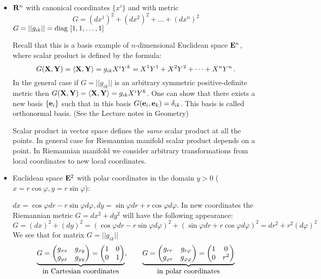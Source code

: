 \documentclass[12pt]{article}
\theoremstyle{theorem}
\numberwithin{equation}{section}
\begin{document}
   \begin{itemize}
\item


   ${\bf R}^n$ with canonical coordinates $\{x^i\}$ and with metric
               $$
           G=(dx^1)^2+(dx^2)^2+\dots+(dx^n)^2
               $$
           $G=||g_{ik}||=\rm diag\,\, [1,1,\dots,1]$

Recall that this is a basis example of $n$-dimensional 
Euclidean space ${\bf E}^n$, where scalar product
is defined by the formula:
              $$
     G({\bf X},{\bf Y})=\langle{\bf X},{\bf Y}\rangle=g_{ik}X^iY^k=X^1Y^1+X^2Y^2+\dots+X^nY^n\,.
              $$
In the general case if $G=||g_{ik}||$ is an
arbitrary symmetric positive-definite metric then
                $
            G({\bf X},{\bf Y})=\langle{\bf X},{\bf Y}\rangle=g_{ik}X^iY^k$.
One can show that there exists a new basis $\{{\bf e}_i\}$ such that in this basis
              $
              G({\bf e}_i,{\bf e}_k)=\delta_{ik}$.
This basis is called orthonormal basis. (See the Lecture notes in Geometry)



Scalar product in vector space defines the {\it same}
scalar product at all the points. In general case
for Riemannian manifold scalar product depends on a point.
In Riemannian manifold we consider arbitrary transformations from
local coordinates to new local coordinates.


\item  Euclidean space ${\bf E}^2$ with polar coordinates in the domain $y>0$
($x=r\cos\varphi, y=r\sin\varphi$):

   $dx=\cos\varphi dr-r\sin\varphi d\varphi, dy=\sin\varphi dr+r\cos\varphi d\varphi$.
  In new coordinates the Riemannian metric $G=dx^2+dy^2$ will
have the following appearance:
             $$
        G=(dx)^2+(dy)^2=(\cos\varphi dr-r\sin\varphi d\varphi)^2+(\sin\varphi dr+r\cos\varphi d\varphi)^2=
         dr^2+r^2(d\varphi)^2
            $$
   We see that for matrix    $G=||g_{ik}||$
             \begin{equation*}
                 \underbrace{G=
           \begin{pmatrix}        g_{xx} &g_{xy}\cr  g_{yx} &g_{yy} \end{pmatrix}=
      \begin{pmatrix}    1 &0\cr  0 &1\cr
\end{pmatrix}}_{\hbox{in Cartesian coordinates}},\qquad
                 \underbrace
                 {G=
      \begin{pmatrix}g_{rr} &g_{r\varphi}\cr g_{\varphi r}
&g_{\varphi\varphi}\end{pmatrix}=
      \begin{pmatrix}1 &0\cr 0 &r^2\end{pmatrix}}_ {\hbox{in polar coordinates}}
             \end{equation*}




\end{itemize}
\end{document}
